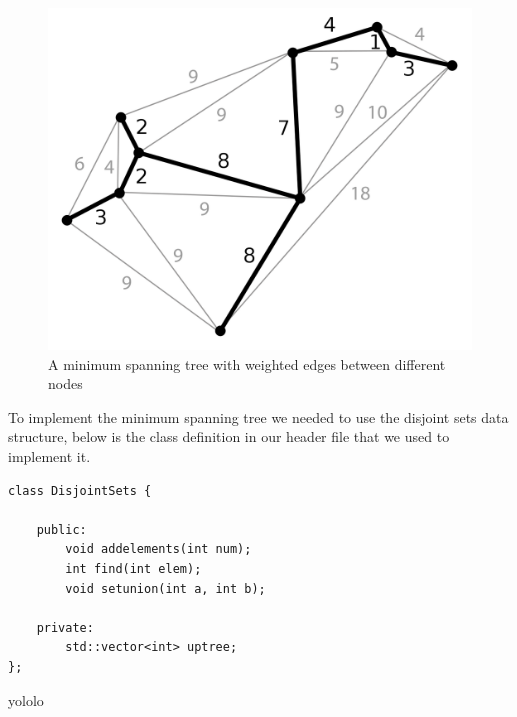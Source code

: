 \documentclass[titlepage]{article}
\begin{document}
\newpage

\begin{figure}[h!]
\includegraphics[width=\linewidth]{mst.png}
\caption{A minimum spanning tree with weighted edges between different nodes}
\label{fig:MST}
\end{figure}

\noindent
To implement the minimum spanning tree we needed to use the disjoint sets data structure, below is the class definition in our header file that we used to implement it.

\begin{lstlisting}
class DisjointSets {

	public:
		void addelements(int num);
		int find(int elem);
		void setunion(int a, int b);

	private:
		std::vector<int> uptree;
};
\end{lstlisting}

\newpage

\noindent
yololo
\end{document}
